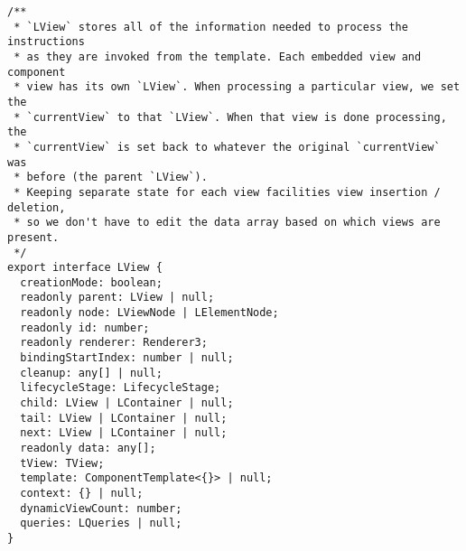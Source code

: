 \begin{verbatim}
/**
 * `LView` stores all of the information needed to process the instructions
 * as they are invoked from the template. Each embedded view and component
 * view has its own `LView`. When processing a particular view, we set the
 * `currentView` to that `LView`. When that view is done processing, the
 * `currentView` is set back to whatever the original `currentView` was
 * before (the parent `LView`).
 * Keeping separate state for each view facilities view insertion / deletion,
 * so we don't have to edit the data array based on which views are present.
 */
export interface LView {
  creationMode: boolean;
  readonly parent: LView | null;
  readonly node: LViewNode | LElementNode;
  readonly id: number;
  readonly renderer: Renderer3;
  bindingStartIndex: number | null;
  cleanup: any[] | null;
  lifecycleStage: LifecycleStage;
  child: LView | LContainer | null;
  tail: LView | LContainer | null;
  next: LView | LContainer | null;
  readonly data: any[];
  tView: TView;
  template: ComponentTemplate<{}> | null;
  context: {} | null;
  dynamicViewCount: number;
  queries: LQueries | null;
}
\end{verbatim}
